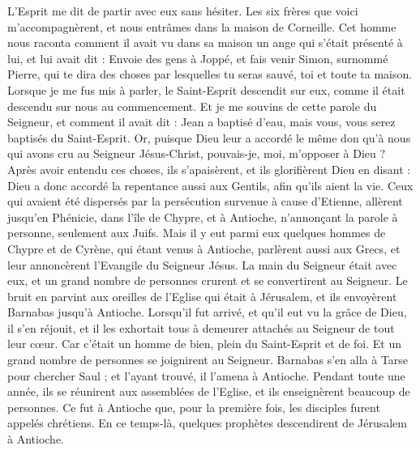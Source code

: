 \begin{multicols}{2}
L'Esprit me dit de partir avec eux sans hésiter. Les six frères que voici m'accompagnèrent, et nous entrâmes dans la maison de Corneille.
Cet homme nous raconta comment il avait vu dans sa maison un ange qui s'était présenté à lui, et lui avait dit : Envoie des gens à Joppé, et fais venir Simon, surnommé Pierre,
qui te dira des choses par lesquelles tu seras sauvé, toi et toute ta maison.
Lorsque je me fus mis à parler, le Saint-Esprit descendit sur eux, comme il était descendu sur nous au commencement.
Et je me souvins de cette parole du Seigneur, et comment il avait dit : Jean a baptisé d'eau, mais vous, vous serez baptisés du Saint-Esprit.
Or, puisque Dieu leur a accordé le même don qu'à nous qui avons cru au Seigneur Jésus-Christ, pouvais-je, moi, m'opposer à Dieu ?
Après avoir entendu ces choses, ils s'apaisèrent, et ils glorifièrent Dieu en disant : Dieu a donc accordé la repentance aussi aux Gentils, afin qu'ils aient la vie.
Ceux qui avaient été dispersés par la persécution survenue à cause d'Etienne, allèrent jusqu'en Phénicie, dans l'île de Chypre, et à Antioche, n'annonçant la parole à personne, seulement aux Juifs.
Mais il y eut parmi eux quelques hommes de Chypre et de Cyrène, qui étant venus à Antioche, parlèrent aussi aux Grecs, et leur annoncèrent l'Evangile du Seigneur Jésus.
La main du Seigneur était avec eux, et un grand nombre de personnes crurent et se convertirent au Seigneur.
Le bruit en parvint aux oreilles de l'Eglise qui était à Jérusalem, et ils envoyèrent Barnabas jusqu'à Antioche.
Lorsqu'il fut arrivé, et qu'il eut vu la grâce de Dieu, il s'en réjouit, et il les exhortait tous à demeurer attachés au Seigneur de tout leur cœur.
Car c'était un homme de bien, plein du Saint-Esprit et de foi. Et un grand nombre de personnes se joignirent au Seigneur.
Barnabas s'en alla à Tarse pour chercher Saul ;
et l'ayant trouvé, il l'amena à Antioche. Pendant toute une année, ils se réunirent aux assemblées de l'Eglise, et ils enseignèrent beaucoup de personnes. Ce fut à Antioche que, pour la première fois, les disciples furent appelés chrétiens.
En ce temps-là, quelques prophètes descendirent de Jérusalem à Antioche.

\end{multicols}
